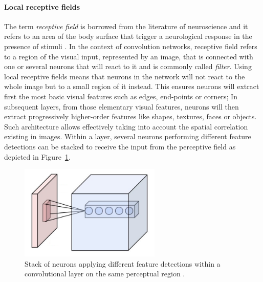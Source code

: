 \paragraph{Local receptive fields}
The term \emph{receptive field} is borrowed from the literature of neuroscience and it refers to an area of the body surface that trigger a neurological response in the presence of stimuli \cite{Sherrington1906,Alonso2008}.
In the context of convolution networks, receptive field refers to a region of the visual input, represented by an image, that is connected with one or several neurons that will react to it and is commonly called \emph{filter}.
Using local receptive fields means that neurons in the network will not react to the whole image but to a small region of it instead.
This ensures neurons will extract first the most basic visual features such as edges, end-points or corners;
In subsequent layers, from those elementary visual features, neurons will then extract progressively higher-order features like shapes, textures, faces or objects.
Such architecture allows effectively taking into account the spatial correlation existing in images.
Within a layer, several neurons performing different feature detections can be stacked to receive the input from the perceptive field as depicted in Figure~\ref{fig:sec:theory:convnets:conv-layer-1}.

\begin{figure}[htb]
  \begin{center}
    \includegraphics[width=0.6\textwidth]{gfx/conv-layer-1}
  \end{center}
  \caption{
    Stack of neurons applying different feature detections within a convolutional layer on the same perceptual region \cite{Aphex342015}.
  }
  \label{fig:sec:theory:convnets:conv-layer-1}
\end{figure}

